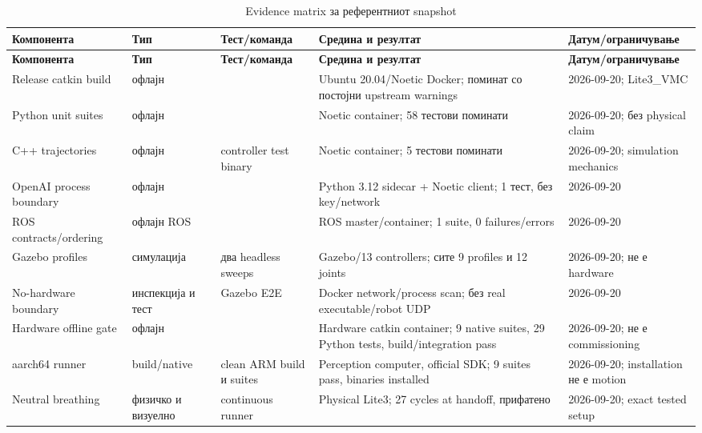 \begingroup
\scriptsize
\setlength{\tabcolsep}{2pt}
\setlength{\LTleft}{0pt}
\setlength{\LTright}{0pt}
\begin{longtable}{@{}L{0.18\textwidth}L{0.11\textwidth}L{0.18\textwidth}L{0.29\textwidth}L{0.18\textwidth}@{}}
\caption{Evidence matrix за референтниот snapshot}\label{tab:evidence-matrix}\\
\toprule
\textbf{Компонента} & \textbf{Тип} & \textbf{Тест/команда} & \textbf{Средина и резултат} & \textbf{Датум/ограничување} \\
\midrule
\endfirsthead
\toprule
\textbf{Компонента} & \textbf{Тип} & \textbf{Тест/команда} & \textbf{Средина и резултат} & \textbf{Датум/ограничување} \\
\midrule
\endhead
\bottomrule
\endfoot
Release catkin build & офлајн &  & Ubuntu 20.04/Noetic Docker; поминат со постојни upstream warnings & 2026-09-20; Lite3\_VMC  \\
Python unit suites & офлајн &  & Noetic container; 58 тестови поминати & 2026-09-20; без physical claim \\
C++ trajectories & офлајн & controller test binary & Noetic container; 5 тестови поминати & 2026-09-20; simulation mechanics \\
OpenAI process boundary & офлајн & \allowbreak{} & Python 3.12 sidecar + Noetic client; 1 тест, без key/network & 2026-09-20 \\
ROS contracts/ordering & офлајн ROS &  & ROS master/container; 1 suite, 0 failures/errors & 2026-09-20 \\
Gazebo profiles & симулација & два headless sweeps & Gazebo/13 controllers; сите 9 profiles и 12 joints & 2026-09-20; не е hardware \\
No-hardware boundary & инспекција и тест & Gazebo E2E & Docker network/process scan; без real executable/robot UDP & 2026-09-20 \\
Hardware offline gate & офлајн & \allowbreak{} & Hardware catkin container; 9 native suites, 29 Python tests, build/integration pass & 2026-09-20; не е commissioning \\
aarch64 runner & build/native & clean ARM build и suites & Perception computer, official SDK; 9 suites pass, binaries installed & 2026-09-20; installation не е motion \\
Neutral breathing & физичко и визуелно & continuous runner & Physical Lite3; 27 cycles at handoff, прифатено & 2026-09-20; exact tested setup \\

\end{longtable}
